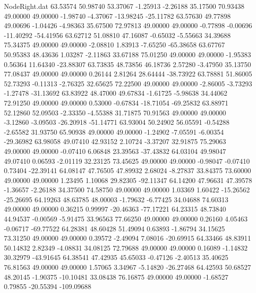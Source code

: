 \begin{filecontents}{NodeRight.dat}
  63.53574   50.98740   53.37067    -1.25913   -2.26188   35.17500   70.93438   49.00000   49.00000   -1.98740   -4.37067  -13.98245  -25.11782
  63.57630   49.77898   49.00696    -1.04426   -4.98363   35.67500   72.97813   49.00000   49.00000   -0.77898   -0.00696  -11.40292  -54.41956
  63.62712   51.08810   47.16087    -0.65032   -5.55663   34.39688   75.34375   49.00000   49.00000   -2.08810    1.83913   -7.65250  -65.38658
  63.67767   50.95383   48.43636     1.03287   -2.11863   33.67188   75.01250   49.00000   49.00000   -1.95383    0.56364   11.64340  -23.88307
  63.73835   48.73856   46.18736     2.57280   -3.47950   35.13750   77.08437   49.00000   49.00000    0.26144    2.81264   28.64444  -38.73922
  63.78881   51.86005   52.73293    -0.11313   -2.76325   32.65625   72.22500   49.00000   49.00000   -2.86005   -3.73293   -1.27478  -31.13692
  63.83922   48.47000   49.67834    -1.61725   -5.98638   34.44062   72.91250   49.00000   49.00000    0.53000   -0.67834  -18.71054  -69.25832
  63.88971   52.12860   52.09503    -2.33350   -4.55388   31.71875   70.91563   49.00000   49.00000   -3.12860   -3.09503  -26.20918  -51.14771
  63.93004   50.24902   56.05591    -0.54288   -2.65582   31.93750   65.90938   49.00000   49.00000   -1.24902   -7.05591   -6.00354  -29.36982
  63.98058   49.07410   42.93152     2.10724   -3.37207   32.91875   75.29063   49.00000   49.00000   -0.07410    6.06848   23.39563  -37.43832
  64.03104   49.98047   49.07410     0.06593   -2.01119   32.23125   73.45625   49.00000   49.00000   -0.98047   -0.07410    0.73404  -22.39141
  64.08147   47.76505   47.89932     2.68024   -8.27837   33.84375   73.60000   49.00000   49.00000    1.23495    1.10068   29.82305  -92.11347
  64.14200   47.96631   47.39578    -1.36657   -2.26188   34.37500   74.58750   49.00000   49.00000    1.03369    1.60422  -15.26562  -25.26695
  64.19263   48.63785   48.00003    -1.79632   -6.77425   34.04688   74.60313   49.00000   49.00000    0.36215    0.99997  -20.46363  -77.17221
  64.23315   48.73840   44.94537    -0.00569   -5.91475   33.96563   77.66250   49.00000   49.00000    0.26160    4.05463   -0.06717  -69.77522
  64.28381   48.60428   51.49094     0.63893   -1.86794   34.15625   73.31250   49.00000   49.00000    0.39572   -2.49094    7.08016  -20.69915
  64.33466   48.83911   50.14832     2.82349   -4.08831   34.08125   72.79688   49.00000   49.00000    0.16089   -1.14832   30.32979  -43.91645
  64.38541   47.42935   45.65033    -0.47126   -2.40513   35.40625   76.81563   49.00000   49.00000    1.57065    3.34967   -5.14820  -26.27468
  64.42593   50.68527   48.20145    -1.90375  -10.10481   33.08438   76.16875   49.00000   49.00000   -1.68527    0.79855  -20.55394 -109.09688

\end{filecontents}
